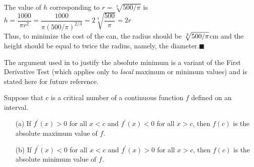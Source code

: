 \documentclass{sebase}
\begin{document}
\begin{Solution}

The value of $h$ corresponding to $r=\sqrt[3]{500/\pi }$ is\\[6pt]
\hspace*{\fill}$h=\dfrac{1000}{\pi r^{2}}=\dfrac{1000}{\pi (500/\pi )^{2/3}}%
=2\sqrt[3]{\dfrac{500}{\pi }}=2r$\hspace*{\fill}\\[6pt]
Thus, to minimize the cost of the can, the radius should be $\sqrt[3]{%
500/\pi }${}\thinspace cm and the height should be equal to twice the
radius, namely, the diameter.$\blacksquare $
\end{Solution}

\quad The argument used in 
to justify the absolute minimum is a variant of the First Derivative Test
(which applies only to \textit{local} maximum or minimum values) and is
stated here for future reference.

\STARTBOX%
\vspace{3pt}

\vspace{3pt}

Suppose that $c$ is a critical number of a continuous function $f$ defined
on an interval.

\begin{enumerate}
\item[(a)] If $f^{\prime }(x)>0$ for all $x<c$ and $f^{\prime }(x)<0$ for
all $x>c$, then $f(c)$ is the\newline
absolute maximum value of $f$.

\item[(b)] If $f^{\prime }(x)<0$ for all $x<c$ and $f^{\prime }(x)>0$ for
all $x>c$, then $f(c)$ is the\newline
absolute minimum value of $f$.
\end{enumerate}
\end{document}
